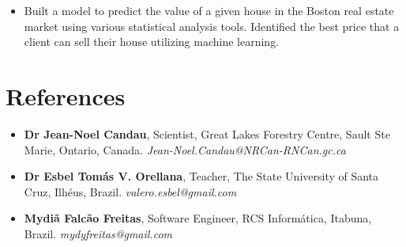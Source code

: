 \documentclass[10pt, a4paper, oneside, final]{scrartcl} %
\begin{document}
\begin{itemize}\itemsep1.5pt
\item Built a model to predict the value of a given house in the Boston real estate market using various statistical analysis tools. Identified the best price that a client can sell their house utilizing machine learning.
\end{itemize}


\section{References}

\begin{itemize} \itemsep2pt \parskip0pt 
\item \textbf{Dr Jean-Noel Candau}, Scientist, Great Lakes Forestry Centre, Sault Ste Marie, Ontario, Canada. \textit{Jean-Noel.Candau@NRCan-RNCan.gc.ca}

\item \textbf{Dr Esbel Tomás V. Orellana}, Teacher, The State University of Santa Cruz, Ilhéus, Brazil. \textit{valero.esbel@gmail.com} 

\item \textbf{Mydiã Falcão Freitas}, Software Engineer, RCS Informática, Itabuna, Brazil. \textit{mydyfreitas@gmail.com} 
\end{itemize}

\end{document}
